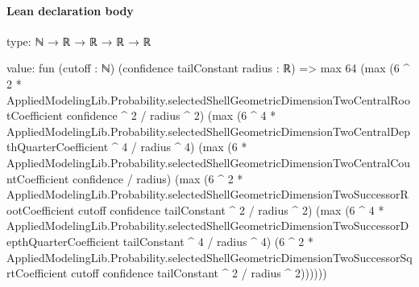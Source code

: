 \documentclass[10pt]{article}
\begin{document}
\paragraph{Lean declaration body}
\begin{ReviewVerbatim}
type:
ℕ → ℝ → ℝ → ℝ → ℝ

value:
fun (cutoff : ℕ) (confidence tailConstant radius : ℝ) =>
  max 64
    (max
      (6 ^ 2 * AppliedModelingLib.Probability.selectedShellGeometricDimensionTwoCentralRootCoefficient confidence ^ 2 /
        radius ^ 2)
      (max
        (6 ^ 4 * AppliedModelingLib.Probability.selectedShellGeometricDimensionTwoCentralDepthQuarterCoefficient ^ 4 /
          radius ^ 4)
        (max
          (6 * AppliedModelingLib.Probability.selectedShellGeometricDimensionTwoCentralCountCoefficient confidence /
            radius)
          (max
            (6 ^ 2 *
                AppliedModelingLib.Probability.selectedShellGeometricDimensionTwoSuccessorRootCoefficient cutoff
                    confidence tailConstant ^
                  2 /
              radius ^ 2)
            (max
              (6 ^ 4 *
                  AppliedModelingLib.Probability.selectedShellGeometricDimensionTwoSuccessorDepthQuarterCoefficient
                      tailConstant ^
                    4 /
                radius ^ 4)
              (6 ^ 2 *
                  AppliedModelingLib.Probability.selectedShellGeometricDimensionTwoSuccessorSqrtCoefficient cutoff
                      confidence tailConstant ^
                    2 /
                radius ^ 2))))))
\end{ReviewVerbatim}
\end{document}

